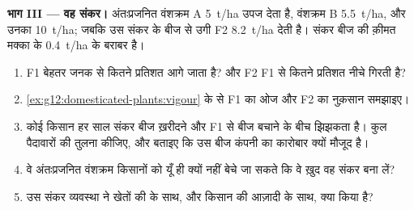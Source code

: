 \begin{problem}
\medskip
\noindent\textbf{भाग III --- वह संकर।}
अंतःप्रजनित वंशक्रम A \qty{5}{t/ha} उपज देता है, वंशक्रम B
\qty{5.5}{t/ha}, और उनका  \qty{10}{t/ha}; जबकि उस संकर के बीज से उगी
F2 \qty{8.2}{t/ha} देती है। संकर बीज की क़ीमत मक्का के \qty{0.4}{t/ha} के
बराबर है।
\begin{enumerate}[resume]
  \item F1 बेहतर जनक से कितने प्रतिशत आगे जाता है? और F2 F1 से कितने प्रतिशत
        नीचे गिरती है?
  \item \cref{ex:g12:domesticated-plants:vigour} के  से F1 का ओज
        और F2 का नुक़सान समझाइए।
  \item कोई किसान हर साल संकर बीज ख़रीदने और F1 से बीज बचाने के बीच झिझकता
        है। कुल पैदावारों की तुलना कीजिए, और बताइए कि उस बीज कंपनी का
        कारोबार क्यों मौजूद है।
  \item वे अंतःप्रजनित वंशक्रम किसानों को यूँ ही क्यों नहीं बेचे जा सकते कि
        वे ख़ुद वह संकर बना लें?
  \item उस संकर व्यवस्था ने खेतों की  के साथ, और किसान की
        आज़ादी के साथ, क्या किया है?
\end{enumerate}


\end{problem}
